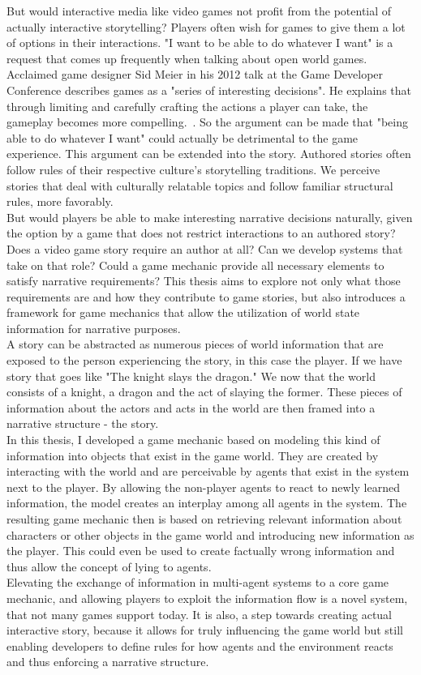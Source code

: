 But would interactive media like video games not profit from the potential of actually interactive storytelling? Players often wish for games to give them a lot of options in their interactions. "I want to be able to do whatever I want" is a request that comes up frequently when talking about open world games. Acclaimed game designer Sid Meier in his 2012 talk at the Game Developer Conference describes games as a "series of interesting decisions". He explains that through limiting and carefully crafting the actions a player can take, the gameplay becomes more compelling.~\cite{Dring2018}. So the argument can be made that "being able to do whatever I want" could actually be detrimental to the game experience. This argument can be extended into the story. Authored stories often follow rules of their respective culture's storytelling traditions. We perceive stories that deal with culturally relatable topics and follow familiar structural rules, more favorably.~\cite{Cooney2017}\\
But would players be able to make interesting narrative decisions naturally, given the option by a game that does not restrict interactions to an authored story? Does a video game story require an author at all? Can we  develop systems that take on that role? Could a game mechanic provide all necessary elements to satisfy narrative requirements? This thesis aims to explore not only what those requirements are and how they contribute to game stories, but also introduces a framework for game mechanics that allow the utilization of world state information for narrative purposes.\\
A story can be abstracted as numerous pieces of world information that are exposed to the person experiencing the story, in this case the player. If we have story that goes like "The knight slays the dragon." We now that the world consists of a knight, a dragon and the act of slaying the former. These pieces of information about the actors and acts in the world are then framed into a narrative structure - the story.\\
In this thesis, I developed a game mechanic based on modeling this kind of information into objects that exist in the game world. They are created by interacting with the world and are perceivable by agents that exist in the system next to the player. By allowing the non-player agents to react to newly learned information, the model creates an interplay among all agents in the system. The resulting game mechanic then is based on retrieving relevant information about characters or other objects in the game world and introducing new information as the player. This could even be used to create factually wrong information and thus allow the concept of lying to agents.\\
Elevating the exchange of information in multi-agent systems to a core game mechanic, and allowing players to exploit the information flow is a novel system, that not many games support today. It is also, a step towards creating actual interactive story, because it allows for truly influencing the game world but still enabling developers to define rules for how agents and the environment reacts and thus enforcing a narrative structure.